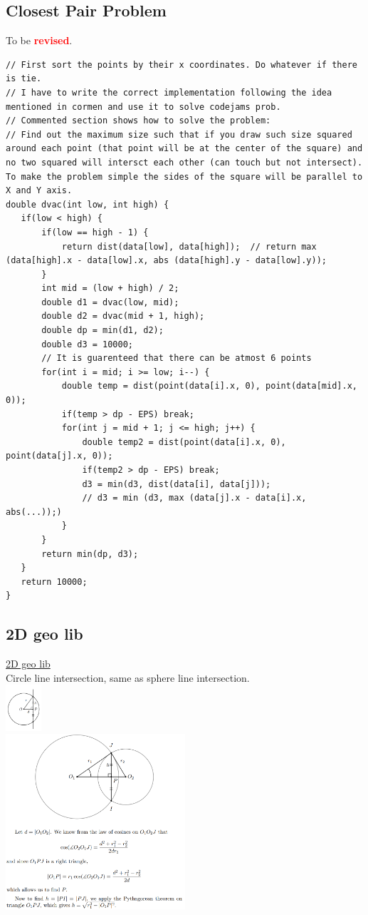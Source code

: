 \documentclass[8pt, a4paper, oneside, twocolumn]{extarticle}
\newcommand{\revised}{To be \textcolor{red}{\textbf{revised}}.}
\begin{document}
\subsection{Closest Pair Problem}
\revised
\begin{verbatim}
// First sort the points by their x coordinates. Do whatever if there is tie.
// I have to write the correct implementation following the idea mentioned in cormen and use it to solve codejams prob.
// Commented section shows how to solve the problem: 
// Find out the maximum size such that if you draw such size squared around each point (that point will be at the center of the square) and no two squared will intersct each other (can touch but not intersect). To make the problem simple the sides of the square will be parallel to X and Y axis.
double dvac(int low, int high) {
   if(low < high) {
       if(low == high - 1) {
           return dist(data[low], data[high]);  // return max (data[high].x - data[low].x, abs (data[high].y - data[low].y));  
       }
       int mid = (low + high) / 2;
       double d1 = dvac(low, mid);
       double d2 = dvac(mid + 1, high);
       double dp = min(d1, d2);
       double d3 = 10000;
       // It is guarenteed that there can be atmost 6 points
       for(int i = mid; i >= low; i--) {
           double temp = dist(point(data[i].x, 0), point(data[mid].x, 0));
           if(temp > dp - EPS) break;
           for(int j = mid + 1; j <= high; j++) {
               double temp2 = dist(point(data[i].x, 0), point(data[j].x, 0));
               if(temp2 > dp - EPS) break;
               d3 = min(d3, dist(data[i], data[j]));
               // d3 = min (d3, max (data[j].x - data[i].x, abs(...));)
           }
       }
       return min(dp, d3);
   }
   return 10000;
}

\end{verbatim}
\subsection{2D geo lib}
\href{https://github.com/sourabh2311/Competitive-Programming/blob/master/Libs/2dgeoLib.cpp}{2D geo lib}
\\Circle line intersection, same as sphere line intersection.\\
\includegraphics[width=0.1\textwidth,height=0.1\textheight,keepaspectratio]{circleline}
\\\includegraphics[width=0.5\textwidth,height=0.5\textheight,keepaspectratio]{circlecircle}
\end{document}
